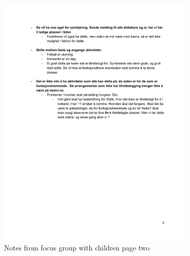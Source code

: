 \begin{figure}[H]
\centering
    \includegraphics[width=0.85\textwidth]{fig/focusgroup/FGChildren_2.pdf}
    \caption{Notes from focus group with children page two}
    \label{Children_2}
\end{figure}

